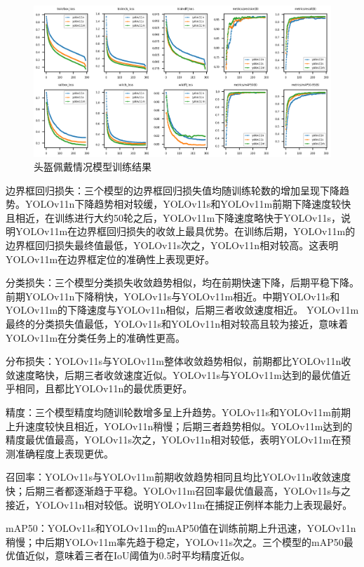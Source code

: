 \begin{figure}[H]
    \centering
    \includegraphics[width=1\textwidth]{figs/chap04/helmetResult.png}
    \caption{头盔佩戴情况模型训练结果}
    \label{fig:helmetResult}
\end{figure}

边界框回归损失：三个模型的边界框回归损失值均随训练轮数的增加呈现下降趋势。YOLOv11n下降趋势相对较缓，YOLOv11s和YOLOv11m前期下降速度较快且相近，在训练进行大约50轮之后，YOLOv11m下降速度略快于YOLOv11s，说明YOLOv11m在边界框回归损失的收敛上最具优势。在训练后期，YOLOv11m的边界框回归损失最终值最低，YOLOv11s次之，YOLOv11n相对较高。这表明YOLOv11m在边界框定位的准确性上表现更好。

分类损失：三个模型分类损失收敛趋势相似，均在前期快速下降，后期平稳下降。前期YOLOv11n下降稍快，YOLOv11s与YOLOv11m相近。中期YOLOv11s和YOLOv11m的下降速度与YOLOv11n相似，后期三者收敛速度相近。
YOLOv11m最终的分类损失值最低，YOLOv11s和YOLOv11n相对较高且较为接近，意味着YOLOv11m在分类任务上的准确性更高。

分布损失：YOLOv11s与YOLOv11m整体收敛趋势相似，前期都比YOLOv11n收敛速度略快，后期三者收敛速度近似。YOLOv11s与YOLOv11m达到的最优值近乎相同，且都比YOLOv11n的最优质更好。

精度：三个模型精度均随训轮数增多呈上升趋势。YOLOv11s和YOLOv11m前期上升速度较快且相近，YOLOv11n稍慢；后期三者趋势相似。YOLOv11m达到的精度最优值最高，YOLOv11s次之，YOLOv11n相对较低，表明YOLOv11m在预测准确程度上表现更优。

召回率：YOLOv11s与YOLOv11m前期收敛趋势相同且均比YOLOv11n收敛速度快；后期三者都逐渐趋于平稳。YOLOv11m召回率最优值最高，YOLOv11s与之接近，YOLOv11n相对较低。说明YOLOv11m在捕捉正例样本能力上表现最好。

mAP50：YOLOv11s和YOLOv11m的mAP50值在训练前期上升迅速，YOLOv11n稍慢；中后期YOLOv11m率先趋于稳定，YOLOv11s次之。三个模型的mAP50最优值近似，意味着三者在IoU阈值为0.5时平均精度近似。

